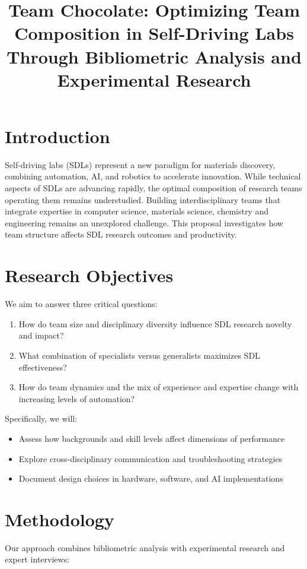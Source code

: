 \documentclass[11pt,letterpaper,twocolumn]{article}
\title{\textbf{Team Chocolate: Optimizing Team Composition in Self-Driving Labs Through Bibliometric Analysis and Experimental Research}}
\date{}
\begin{document}
\maketitle
\thispagestyle{plain}

\section{Introduction}
Self-driving labs (SDLs) represent a new paradigm for materials discovery, combining automation, AI, and robotics to accelerate innovation\cite{sterling2024}. While technical aspects of SDLs are advancing rapidly, the optimal composition of research teams operating them remains understudied. Building interdisciplinary teams that integrate expertise in computer science, materials science, chemistry and engineering remains an unexplored challenge. This proposal investigates how team structure affects SDL research outcomes and productivity.

\section{Research Objectives}
We aim to answer three critical questions:
\begin{enumerate}
    \item How do team size and disciplinary diversity influence SDL research novelty and impact?
    \item What combination of specialists versus generalists maximizes SDL effectiveness?
    \item How do team dynamics and the mix of experience and expertise change with increasing levels of automation?
\end{enumerate}

Specifically, we will:
\begin{itemize}
    \item Assess how backgrounds and skill levels affect dimensions of performance
    \item Explore cross-disciplinary communication and troubleshooting strategies
    \item Document design choices in hardware, software, and AI implementations
\end{itemize}

\section{Methodology}
Our approach combines bibliometric analysis with experimental research and expert interviews:
\end{document}
